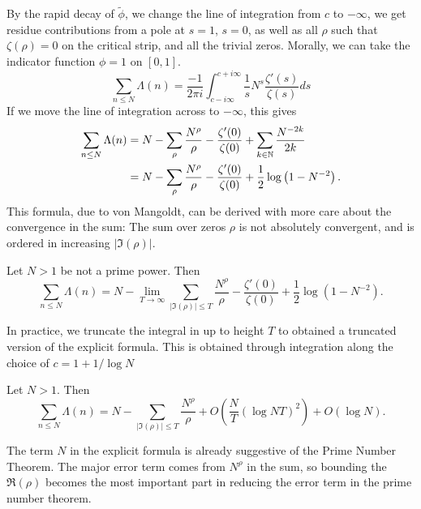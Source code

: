 By the rapid decay of $\tilde\phi$, we change the line of integration from $c$ to $-\infty$, we get residue contributions from
a pole at $s=1$, $s=0$, as well as all $\rho$ such that $\zeta(\rho)=0$ on the critical strip,
and all the trivial zeros. 
Morally, we can take the indicator function $\phi=1$ on $[0,1]$. 
\begin{equation}\label{preexplicit}
    \sum_{n\leq N} \Lambda(n)=
    \frac{-1}{2\pi i}\int_{c-i\infty}^{c+i\infty}
    \frac{1}{s} N^s \frac{\zeta'(s)}{\zeta(s)} ds
\end{equation}
If we move the line of integration across to $-\infty$, this gives \begin{equation}
    \begin{split}
        \sum_{n\leq N} \Lambda(n)&= N - \sum_{\rho} \frac{N^\rho}{\rho} -
        \frac{\zeta'(0)}{\zeta(0)} + \sum_{k\in\mathbb{N}}\frac{N^{-2k}}{2k} \\
        &= N - \sum_{\rho} \frac{N^\rho}{\rho} -
        \frac{\zeta'(0)}{\zeta(0)} + \frac{1}{2}\log\left(1-N^{-2}\right). 
    \end{split}
\end{equation}
This formula, due to von Mangoldt, can be derived with more care about the convergence in the sum:
The sum over zeros $\rho$ is not absolutely convergent, and is ordered in increasing $|\Im(\rho)|$.
\begin{theorem}
    Let $N>1$ be not a prime power. Then\begin{equation}
    \sum_{n\leq N} \Lambda(n) = N - \lim_{T\to \infty}\sum_{|\Im{(\rho)}|\leq T} \frac{N^\rho}{\rho} -
    \frac{\zeta'(0)}{\zeta(0)} + \frac{1}{2}\log\left(1-N^{-2}\right). 
    \end{equation}
\end{theorem}
In practice, we truncate the integral in \label{preexplicit} up to height $T$ to obtained a truncated version of the explicit formula.
This is obtained through integration along the choice of $c=1+1/\log N$
\begin{theorem} \label{truncateexplcit}
    Let $N>1$. Then\begin{equation}
        \sum_{n\leq N} \Lambda(n) = N - \sum_{|\Im{(\rho)}|\leq T} \frac{N^\rho}{\rho} + O(\frac{N}{T}(\log NT) ^2) + O(\log N). 
        \end{equation}
\end{theorem}
The term $N$ in the explicit formula is already suggestive of the Prime Number Theorem. 
The major error term comes from $N^\rho$ in the sum, so bounding the $\Re(\rho)$ becomes the most important part in reducing the error term in the prime number theorem. 
